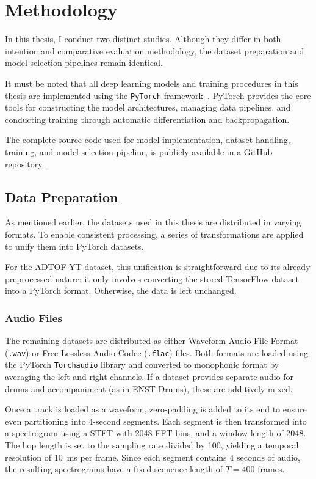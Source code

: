 \chapter{Methodology}\label{Methodology}

In this thesis, I conduct two distinct studies. Although they differ in both intention and comparative evaluation methodology, the dataset preparation and model selection pipelines remain identical.

It must be noted that all deep learning models and training procedures in this thesis are implemented using the \texttt{PyTorch} framework~\cite{paszke2019pytorch}. PyTorch provides the core tools for constructing the model architectures, managing data pipelines, and conducting training through automatic differentiation and backpropagation.

The complete source code used for model implementation, dataset handling, training, and model selection pipeline, is publicly available in a GitHub repository~\cite{fosse2025}.

\section{Data Preparation}

As mentioned earlier, the datasets used in this thesis are distributed in varying formats. To enable consistent processing, a series of transformations are applied to unify them into PyTorch datasets.

For the ADTOF-YT dataset, this unification is straightforward due to its already preprocessed nature: it only involves converting the stored TensorFlow dataset into a PyTorch format. Otherwise, the data is left unchanged.

\subsection{Audio Files}

The remaining datasets are distributed as either Waveform Audio File Format (\texttt{.wav}) or Free Lossless Audio Codec (\texttt{.flac}) files. Both formats are loaded using the PyTorch \texttt{Torchaudio} library and converted to monophonic format by averaging the left and right channels. If a dataset provides separate audio for drums and accompaniment (as in ENST-Drums), these are additively mixed.

Once a track is loaded as a waveform, zero-padding is added to its end to ensure even partitioning into 4-second segments. Each segment is then transformed into a spectrogram using a \acrfull{STFT} with 2048 FFT bins, and a window length of 2048. The hop length is set to the sampling rate divided by 100, yielding a temporal resolution of 10~ms per frame. Since each segment contains 4 seconds of audio, the resulting spectrograms have a fixed sequence length of $T = 400$ frames.

